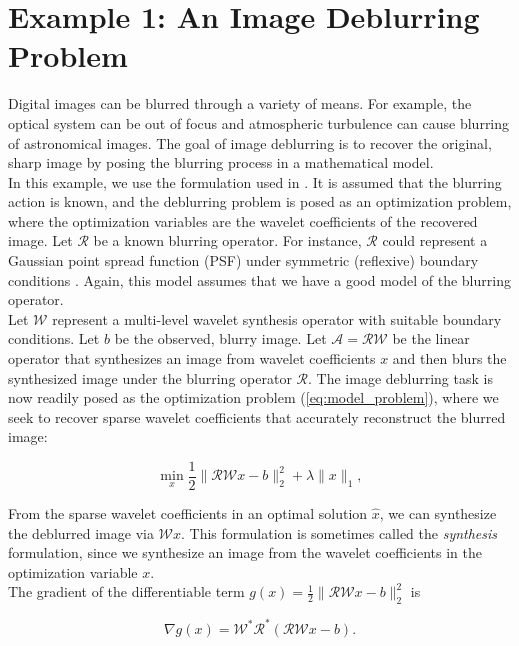 \documentclass[journal]{IEEEtran}
\begin{document}
\section{Example 1: An Image Deblurring Problem}
Digital images can be blurred through a variety of means.  For example, the optical system can be out of focus and atmospheric turbulence can cause blurring of astronomical images.  The goal of image deblurring is to recover the original, sharp image by posing the blurring process in a mathematical model.\\

In this example, we use the formulation used in \cite{beck_2009}.  It is assumed that the blurring action is known, and the deblurring problem is posed as an optimization problem, where the optimization variables are the wavelet coefficients of the recovered image.  Let $\mathcal{R}$ be a known blurring operator.  For instance, $\mathcal{R}$ could represent a Gaussian point spread function (PSF) under symmetric (reflexive) boundary conditions \cite{hansen_2006}.  Again, this model assumes that we have a good model of the blurring operator.\\

Let $\mathcal{W}$ represent a multi-level wavelet synthesis operator with suitable boundary conditions.  Let $b$ be the observed, blurry image.  Let $\mathcal{A}=\mathcal{RW}$ be the linear operator that synthesizes an image from wavelet coefficients $x$ and then blurs the synthesized image under the blurring operator $\mathcal{R}$.  The image deblurring task is now readily posed as the optimization problem (\ref{eq:model_problem}), where we seek to recover sparse wavelet coefficients that accurately reconstruct the blurred image:

\begin{equation}
\label{eq:syn_problem}
\min_x \dfrac{1}{2}\|\mathcal{RW}x-b\|_2^2 + \lambda \|x\|_1,
\end{equation}

\noindent From the sparse wavelet coefficients in an optimal solution $\hat{x}$, we can synthesize the deblurred image via $\mathcal{W}\hat{x}$.  This formulation is sometimes called the \emph{synthesis} formulation, since we synthesize an image from the wavelet coefficients in the optimization variable $x$.\\

The gradient of the differentiable term ${g(x)=\frac{1}{2}\|\mathcal{RW}x-b\|_2^2}$ is

\[ \nabla g(x) = \mathcal{W}^\ast \mathcal{R}^\ast(\mathcal{RW}x-b). \] 
\end{document}
